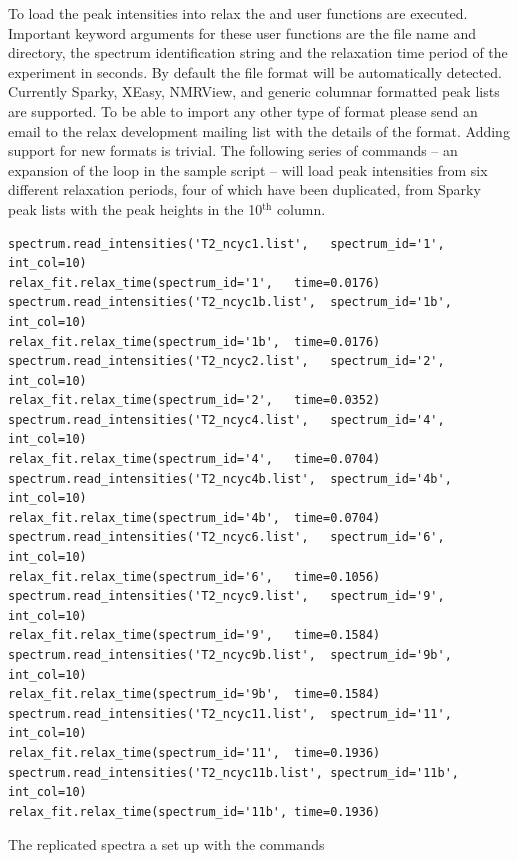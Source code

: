 To load the peak intensities into relax the  and  user functions are executed.
Important keyword arguments for these user functions are the file name and directory, the spectrum identification string and the relaxation time period of the experiment in seconds.
By default the file format will be automatically detected.
Currently Sparky, XEasy, NMRView, and generic columnar formatted peak lists are supported.
To be able to import any other type of format please send an email to the relax development mailing list with the details of the format.
Adding support for new formats is trivial.
The following series of commands -- an expansion of the  loop in the sample script -- will load peak intensities from six different relaxation periods, four of which have been duplicated, from Sparky peak lists with the peak heights in the 10$^{\textrm{th}}$ column.

\begin{lstlisting}[numbers=none]
spectrum.read_intensities('T2_ncyc1.list',   spectrum_id='1', int_col=10)
relax_fit.relax_time(spectrum_id='1',   time=0.0176)
spectrum.read_intensities('T2_ncyc1b.list',  spectrum_id='1b', int_col=10)
relax_fit.relax_time(spectrum_id='1b',  time=0.0176)
spectrum.read_intensities('T2_ncyc2.list',   spectrum_id='2', int_col=10)
relax_fit.relax_time(spectrum_id='2',   time=0.0352)
spectrum.read_intensities('T2_ncyc4.list',   spectrum_id='4', int_col=10)
relax_fit.relax_time(spectrum_id='4',   time=0.0704)
spectrum.read_intensities('T2_ncyc4b.list',  spectrum_id='4b', int_col=10)
relax_fit.relax_time(spectrum_id='4b',  time=0.0704)
spectrum.read_intensities('T2_ncyc6.list',   spectrum_id='6', int_col=10)
relax_fit.relax_time(spectrum_id='6',   time=0.1056)
spectrum.read_intensities('T2_ncyc9.list',   spectrum_id='9', int_col=10)
relax_fit.relax_time(spectrum_id='9',   time=0.1584)
spectrum.read_intensities('T2_ncyc9b.list',  spectrum_id='9b', int_col=10)
relax_fit.relax_time(spectrum_id='9b',  time=0.1584)
spectrum.read_intensities('T2_ncyc11.list',  spectrum_id='11', int_col=10)
relax_fit.relax_time(spectrum_id='11',  time=0.1936)
spectrum.read_intensities('T2_ncyc11b.list', spectrum_id='11b', int_col=10)
relax_fit.relax_time(spectrum_id='11b', time=0.1936)
\end{lstlisting}

The replicated spectra a set up with the commands

